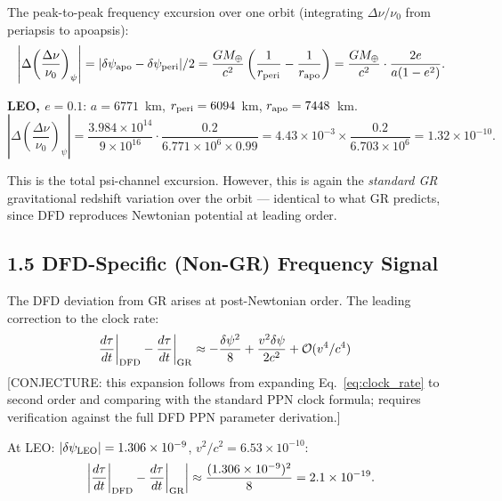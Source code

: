 \documentclass[11pt,twocolumn]{article}
\newcommand{\dpsi}{\delta\psi}
\newcommand{\order}[1]{\mathcal{O}(#1)}
\begin{document}
The peak-to-peak frequency excursion over one orbit (integrating
$\Delta\nu/\nu_0$ from periapsis to apoapsis):
\begin{equation}
\left|\Delta\!\left(\frac{\Delta\nu}{\nu_0}\right)_\psi\right|
= |\dpsi_{\rm apo} - \dpsi_{\rm peri}|/2
= \frac{GM_\oplus}{c^2}\left(\frac{1}{r_{\rm peri}} - \frac{1}{r_{\rm apo}}\right)
= \frac{GM_\oplus}{c^2}\cdot\frac{2e}{a(1-e^2)}.
\label{eq:orbit_excursion}
\end{equation}

\textbf{LEO, $e=0.1$}: $a = 6771$~km, $r_{\rm peri} = 6094$~km,
$r_{\rm apo} = 7448$~km.
\begin{equation}
\left|\Delta\!\left(\frac{\Delta\nu}{\nu_0}\right)_\psi\right|
= \frac{3.984\times10^{14}}{9\times10^{16}}
  \cdot\frac{0.2}{6.771\times10^6\times0.99}
= 4.43\times10^{-3}
  \times\frac{0.2}{6.703\times10^6}
= 1.32\times10^{-10}.
\label{eq:orbit_excursion_numerical}
\end{equation}

This is the total psi-channel excursion. However, this is again the
\textit{standard GR} gravitational redshift variation over the orbit ---
identical to what GR predicts, since DFD reproduces Newtonian potential
at leading order.

\subsection*{1.5 DFD-Specific (Non-GR) Frequency Signal}

The DFD deviation from GR arises at post-Newtonian order. The
leading correction to the clock rate:
\begin{align}
\frac{d\tau}{dt}\bigg|_{\rm DFD} - \frac{d\tau}{dt}\bigg|_{\rm GR}
&\approx -\frac{\dpsi^2}{8} + \frac{v^2\dpsi}{2c^2} + \order{v^4/c^4}
\label{eq:DFD_vs_GR}
\end{align}
\textcolor{conjecturecolor}{[CONJECTURE: this expansion follows from
expanding Eq.~\eqref{eq:clock_rate} to second order and comparing with
the standard PPN clock formula; requires verification against the full
DFD PPN parameter derivation.]}

At LEO: $|\dpsi_{\rm LEO}| = 1.306\times10^{-9}$, $v^2/c^2 = 6.53\times10^{-10}$:
\begin{equation}
\left|\frac{d\tau}{dt}\bigg|_{\rm DFD} - \frac{d\tau}{dt}\bigg|_{\rm GR}\right|
\approx \frac{(1.306\times10^{-9})^2}{8}
= 2.1\times10^{-19}.
\label{eq:DFD_GR_diff}
\end{equation}
\end{document}
